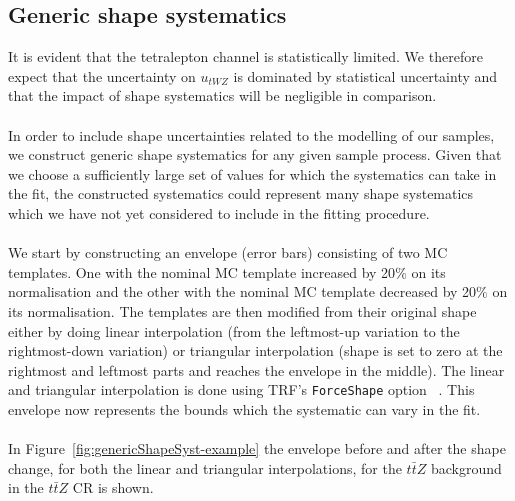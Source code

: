 \subsection{Generic shape systematics}
\label{sec:genericShapeSyst}

It is evident that the tetralepton channel is statistically limited. We therefore expect that the uncertainty on $u_{tWZ}$ is dominated by statistical uncertainty and that the impact of shape systematics will be negligible in comparison.\\\\

In order to include shape uncertainties related to the modelling of our samples, we construct generic shape systematics for any given sample process. Given that we choose a sufficiently large set of values for which the systematics can take in the fit, the constructed systematics could represent many shape systematics which we have not yet considered to include in the fitting procedure.\\\\

We start by constructing an envelope (error bars) consisting of two MC templates. One with the nominal MC template increased by 20$\%$ on its normalisation and the other with the nominal MC template decreased by 20$\%$ on its normalisation. The templates are then modified from their original shape either by doing linear interpolation (from the leftmost-up variation to the rightmost-down variation) or triangular interpolation (shape is set to zero at the rightmost and leftmost parts and reaches the envelope in the middle). The linear and triangular interpolation is done using TRF's \texttt{ForceShape} option ~\cite{TRF-ForceShape}. This envelope now represents the bounds which the systematic can vary in the fit.\\\\

In Figure~\ref{fig:genericShapeSyst-example} the envelope before and after the shape change, for both the linear and triangular interpolations, for the $t\bar{t}Z$ background in the $t\bar{t}Z$ CR is shown.

